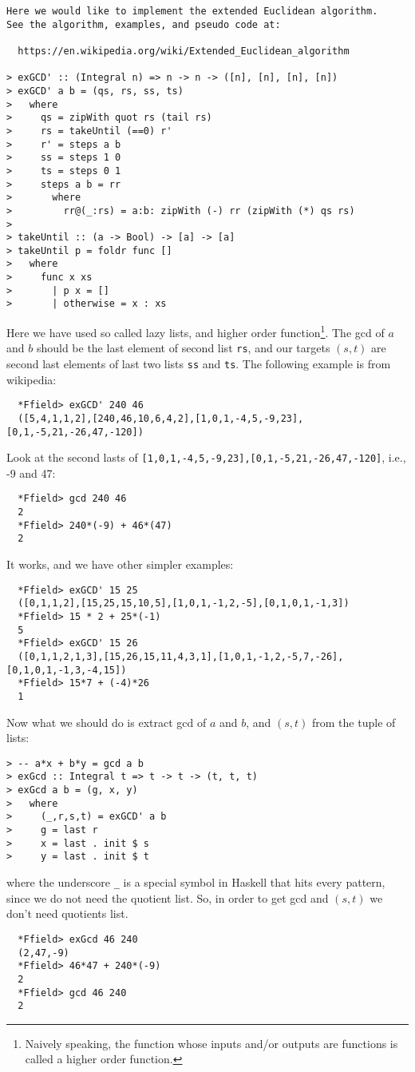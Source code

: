 \documentclass[11pt]{book}
\begin{document}
\label{extendedEuclideanAlgorithm}
\begin{verbatim}
Here we would like to implement the extended Euclidean algorithm.
See the algorithm, examples, and pseudo code at:

  https://en.wikipedia.org/wiki/Extended_Euclidean_algorithm

> exGCD' :: (Integral n) => n -> n -> ([n], [n], [n], [n])
> exGCD' a b = (qs, rs, ss, ts)
>   where
>     qs = zipWith quot rs (tail rs)
>     rs = takeUntil (==0) r'
>     r' = steps a b
>     ss = steps 1 0
>     ts = steps 0 1
>     steps a b = rr
>       where 
>         rr@(_:rs) = a:b: zipWith (-) rr (zipWith (*) qs rs)
>
> takeUntil :: (a -> Bool) -> [a] -> [a]
> takeUntil p = foldr func []
>   where
>     func x xs 
>       | p x = []
>       | otherwise = x : xs
\end{verbatim}
Here we have used so called lazy lists, and higher order function\footnote{
Naively speaking, the function whose inputs and/or outputs are functions is called a higher order function.
}.
The gcd of $a$ and $b$ should be the last element of second list \verb+rs+, and our targets $(s,t)$ are second last elements of last two lists \verb+ss+ and \verb+ts+.
The following example is from wikipedia:
\begin{verbatim}
  *Ffield> exGCD' 240 46
  ([5,4,1,1,2],[240,46,10,6,4,2],[1,0,1,-4,5,-9,23],[0,1,-5,21,-26,47,-120])
\end{verbatim}  
Look at the second lasts of \verb+[1,0,1,-4,5,-9,23],[0,1,-5,21,-26,47,-120]+, i.e., -9 and 47:
\begin{verbatim}  
  *Ffield> gcd 240 46
  2
  *Ffield> 240*(-9) + 46*(47)
  2
\end{verbatim}
It works, and we have other simpler examples:
\begin{verbatim}
  *Ffield> exGCD' 15 25
  ([0,1,1,2],[15,25,15,10,5],[1,0,1,-1,2,-5],[0,1,0,1,-1,3])
  *Ffield> 15 * 2 + 25*(-1)
  5
  *Ffield> exGCD' 15 26
  ([0,1,1,2,1,3],[15,26,15,11,4,3,1],[1,0,1,-1,2,-5,7,-26],[0,1,0,1,-1,3,-4,15])
  *Ffield> 15*7 + (-4)*26
  1
\end{verbatim}
Now what we should do is extract gcd of $a$ and $b$, and $(s,t)$ from the tuple of lists:
\begin{verbatim}
> -- a*x + b*y = gcd a b
> exGcd :: Integral t => t -> t -> (t, t, t)
> exGcd a b = (g, x, y)
>   where
>     (_,r,s,t) = exGCD' a b
>     g = last r
>     x = last . init $ s
>     y = last . init $ t
\end{verbatim}
where the underscore \verb+_+ is a special symbol in Haskell that hits every pattern, since we do not need the quotient list.
So, in order to get gcd and $(s,t)$ we don't need quotients list.
\begin{verbatim}
  *Ffield> exGcd 46 240
  (2,47,-9)
  *Ffield> 46*47 + 240*(-9)
  2
  *Ffield> gcd 46 240
  2
\end{verbatim}
\end{document}
